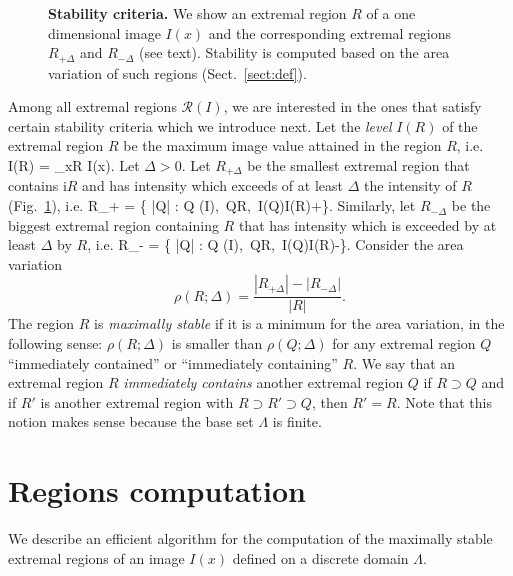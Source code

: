 \documentclass{article}
\begin{document}
\begin{figure}[h!]
\begin{center}

\end{center}
\caption{{\bf Stability criteria.} We show an extremal region $R$ of a one dimensional image $I(x)$ and the corresponding extremal regions $R_{+\Delta}$ and $R_{-\Delta}$ (see text). Stability is computed based on the area variation of such regions (Sect.~\ref{sect:def}).}\label{fig:stab}
\end{figure}

 Among all extremal regions $\mathcal{R}(I)$, we are interested in the ones that satisfy certain stability criteria which we introduce next. Let the {\em level} $I(R)$ of the extremal region $R$ be the maximum image value attained in the region $R$, i.e.
\be\label{eq:level}
  I(R) = \sup_{x\in R} I(x).
\ee
Let $\Delta >0$. Let $R_{+\Delta}$ be the smallest extremal region that contains i$R$ and has intensity which exceeds of at least $\Delta$ the intensity of $R$ (Fig.~\ref{fig:stab}), i.e.
\be\label{eq:rplus}
 R_{+\Delta} = \argmin \{ |Q| : Q \in {}(I),\ Q\supset R,\ I(Q)\geq I(R)+\Delta \}.
\ee
Similarly, let $R_{-\Delta}$ be the biggest extremal region containing $R$ that has intensity which is exceeded by at least $\Delta$ by $R$, i.e.
\be\label{eq:rminus}
 R_{-\Delta} = \argmax \{ |Q| : Q \in {}(I),\ Q\subset R,\ I(Q)\leq I(R)-\Delta \}.
\ee
Consider the area variation
\[
   \rho(R;\Delta) = \frac{|R_{+\Delta}| - |R_{-\Delta}|}{|R|}.
\]
The region $R$ is {\em maximally stable} if it is a minimum for the area variation, in the following sense: $\rho(R;\Delta)$ is smaller than $\rho(Q;\Delta)$ for any extremal region $Q$ ``immediately contained'' or ``immediately containing'' $R$. We say that an extremal region $R$ {\em immediately contains} another extremal region $Q$ if $R\supset Q$ and if $R'$ is another extremal region with $R \supset R' \supset Q$, then $R'=R$. Note that this notion makes sense because the base set $\Lambda$ is finite.

\section{Regions computation}\label{sect:comp}

We describe an efficient algorithm for the computation of the maximally stable extremal regions of an image $I(x)$ defined on a discrete domain $\Lambda$. 
\end{document}
